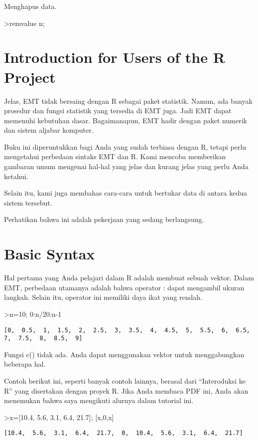 \documentclass[
]{book}
\begin{document}
Menghapus data.

\textgreater remvalue n;

\section{Introduction for Users of the R Project}\label{introduction-for-users-of-the-r-project}

Jelas, EMT tidak bersaing dengan R sebagai paket statistik. Namun, ada banyak prosedur dan fungsi statistik yang tersedia di EMT juga. Jadi EMT dapat memenuhi kebutuhan dasar. Bagaimanapun, EMT hadir dengan paket numerik dan sistem aljabar komputer.

Buku ini diperuntukkan bagi Anda yang sudah terbiasa dengan R, tetapi perlu mengetahui perbedaan sintaks EMT dan R. Kami mencoba memberikan gambaran umum mengenai hal-hal yang jelas dan kurang jelas yang perlu Anda ketahui.

Selain itu, kami juga membahas cara-cara untuk bertukar data di antara kedua sistem tersebut.

Perhatikan bahwa ini adalah pekerjaan yang sedang berlangsung.

\section{Basic Syntax}\label{basic-syntax}

Hal pertama yang Anda pelajari dalam R adalah membuat sebuah vektor. Dalam EMT, perbedaan utamanya adalah bahwa operator : dapat mengambil ukuran langkah. Selain itu, operator ini memiliki daya ikat yang rendah.

\textgreater n=10; 0:n/20:n-1

\begin{verbatim}
[0,  0.5,  1,  1.5,  2,  2.5,  3,  3.5,  4,  4.5,  5,  5.5,  6,  6.5,
7,  7.5,  8,  8.5,  9]
\end{verbatim}

Fungsi c() tidak ada. Anda dapat menggunakan vektor untuk menggabungkan beberapa hal.

Contoh berikut ini, seperti banyak contoh lainnya, berasal dari ``Interoduksi ke R'' yang disertakan dengan proyek R. Jika Anda membaca PDF ini, Anda akan menemukan bahwa saya mengikuti alurnya dalam tutorial ini.

\textgreater x={[}10.4, 5.6, 3.1, 6.4, 21.7{]}; {[}x,0,x{]}

\begin{verbatim}
[10.4,  5.6,  3.1,  6.4,  21.7,  0,  10.4,  5.6,  3.1,  6.4,  21.7]
\end{verbatim}
\end{document}
